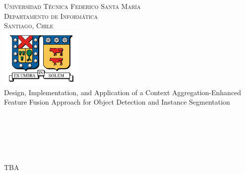 \begin{titlepage}

\begin{center}

\textsc{\Large Universidad Técnica Federico Santa María}\\
\textsc{\large Departamento de Informática}\\
\textsc{\large Santiago, Chile}\\[1.5cm]

\includegraphics[width=0.3\textwidth]{figures/utfsm.jpg}\\[1cm]    


{\huge Design, Implementation, and Application of a Context Aggregation-Enhanced Feature Fusion Approach for Object Detection and Instance Segmentation} \\[1cm]

\\[2cm]
 \\ \\[3cm]
\\
\\

\vfill

{\large TBA}

\end{center}

\end{titlepage}

